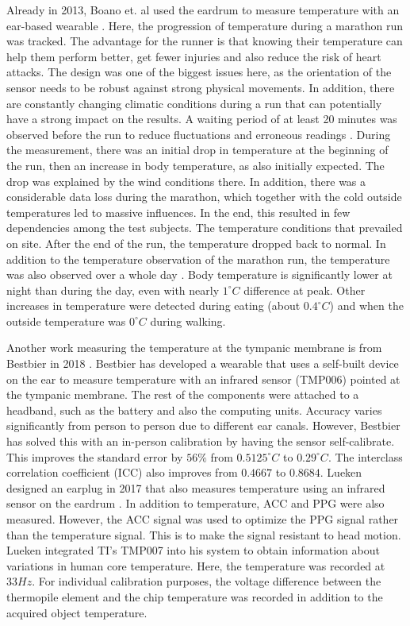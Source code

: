 Already in 2013, Boano et. al used the eardrum to measure temperature with an ear-based wearable \cite{boanoNoninvasiveMeasurementCore2013}. 
Here, the progression of temperature during a marathon run was tracked.
The advantage for the runner is that knowing their temperature can help them perform better, get fewer injuries and also reduce the risk of heart attacks.
The design was one of the biggest issues here, as the orientation of the sensor needs to be robust against strong physical movements.
In addition, there are constantly changing climatic conditions during a run that can potentially have a strong impact on the results.
A waiting period of at least 20 minutes was observed before the run to reduce fluctuations and erroneous readings \cite{chagllae.MeasurementCoreBody2018}.
During the measurement, there was an initial drop in temperature at the beginning of the run, then an increase in body temperature, as also initially expected.
The drop was explained by the wind conditions there.
In addition, there was a considerable data loss during the marathon, which together with the cold outside temperatures led to massive influences. 
In the end, this resulted in few dependencies among the test subjects.
The temperature conditions that prevailed on site. 
After the end of the run, the temperature dropped back to normal.
In addition to the temperature observation of the marathon run, the temperature was also observed over a whole day \cite{boanoNoninvasiveMeasurementCore2013}.
Body temperature is significantly lower at night than during the day, even with nearly $1 ^\circ C$ difference at peak.
Other increases in temperature were detected during eating (about $0.4 ^\circ C$) and when the outside temperature was $0 ^\circ C$ during walking.

Another work measuring the temperature at the tympanic membrane is from Bestbier in 2018 \cite{bestbierDevelopmentVitalSigns2018}.
Bestbier has developed a wearable that uses a self-built device on the ear to measure temperature with an infrared sensor (TMP006) pointed at the tympanic membrane.
The rest of the components were attached to a headband, such as the battery and also the computing units.
Accuracy varies significantly from person to person due to different ear canals.
However, Bestbier has solved this with an in-person calibration by having the sensor self-calibrate.
This improves the standard error by $56\%$ from $0.5125 ^\circ C$ to $0.29 ^\circ C$. The interclass correlation coefficient (ICC) also improves from $0.4667$ to $0.8684$.
Lueken designed an earplug in 2017 that also measures temperature using an infrared sensor on the eardrum \cite{luekenPhotoplethysmographybasedInearSensor2017}.
In addition to temperature, ACC and PPG were also measured.
However, the ACC signal was used to optimize the PPG signal rather than the temperature signal. 
This is to make the signal resistant to head motion.
Lueken integrated TI's TMP007 into his system to obtain information about variations in human core temperature. 
Here, the temperature was recorded at $33 Hz$.
For individual calibration purposes, the voltage difference between the thermopile element and the chip temperature was recorded in addition to the acquired object temperature.

